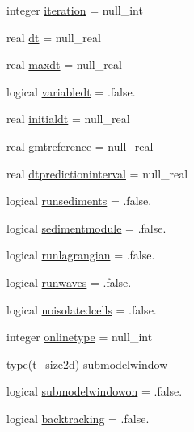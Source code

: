 \begin{DoxyCompactItemize}
\item 
integer \mbox{\hyperlink{structmodulemodel_1_1t__model_ada8bbe29caa1111f8ef4f6ca77d2c2d9}{iteration}} = null\+\_\+int
\item 
real \mbox{\hyperlink{structmodulemodel_1_1t__model_a6c8c248ac9b3151ccf360c14bc020186}{dt}} = null\+\_\+real
\item 
real \mbox{\hyperlink{structmodulemodel_1_1t__model_a94584a739b465a36530b413d47310174}{maxdt}} = null\+\_\+real
\item 
logical \mbox{\hyperlink{structmodulemodel_1_1t__model_a3a000261c5ac1d20133ba98bf28a4df7}{variabledt}} = .false.
\item 
real \mbox{\hyperlink{structmodulemodel_1_1t__model_aeba928d6993cf650ab83a627955c142f}{initialdt}} = null\+\_\+real
\item 
real \mbox{\hyperlink{structmodulemodel_1_1t__model_aaf300d649c20292836cb3cd77ea1d852}{gmtreference}} = null\+\_\+real
\item 
real \mbox{\hyperlink{structmodulemodel_1_1t__model_ac98949e1b6377190bbc08ae30111e3cb}{dtpredictioninterval}} = null\+\_\+real
\item 
logical \mbox{\hyperlink{structmodulemodel_1_1t__model_a6d068134cc4997c9b8416f3ab205fde2}{runsediments}} = .false.
\item 
logical \mbox{\hyperlink{structmodulemodel_1_1t__model_af1fa18b3f782b24ad401055503c0c04f}{sedimentmodule}} = .false.
\item 
logical \mbox{\hyperlink{structmodulemodel_1_1t__model_a8c946e626564dbdbb58864a9330799a8}{runlagrangian}} = .false.
\item 
logical \mbox{\hyperlink{structmodulemodel_1_1t__model_aa9d4b05e334372d1874959db08c1d446}{runwaves}} = .false.
\item 
logical \mbox{\hyperlink{structmodulemodel_1_1t__model_a7f1ad14f9e74371398cd033eea1e24df}{noisolatedcells}} = .false.
\item 
integer \mbox{\hyperlink{structmodulemodel_1_1t__model_ae8d260226fc98ca6f16fffc7820dfa78}{onlinetype}} = null\+\_\+int
\item 
type(t\+\_\+size2d) \mbox{\hyperlink{structmodulemodel_1_1t__model_aafc35a66d6b0c91ae89ff27f69c96899}{submodelwindow}}
\item 
logical \mbox{\hyperlink{structmodulemodel_1_1t__model_ab741279a37ae895ad6bcca72c9679935}{submodelwindowon}} = .false.
\item 
logical \mbox{\hyperlink{structmodulemodel_1_1t__model_aff034f47ca46649bb72f4b7694b23378}{backtracking}} = .false.

\end{DoxyCompactItemize}
